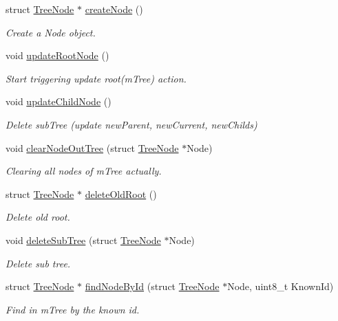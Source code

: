 \begin{DoxyCompactItemize}
struct \hyperlink{struct_tree_node}{Tree\+Node} $\ast$ \hyperlink{class_psd_map_a4413fa2f7b4dbc83449f184c6b4963cc}{create\+Node} ()
\begin{DoxyCompactList}\small\item\em Create a Node object. \end{DoxyCompactList}\item 
void \hyperlink{class_psd_map_ade677b7a2b308a4c5ce99f343ddc56ff}{update\+Root\+Node} ()
\begin{DoxyCompactList}\small\item\em Start triggering update root(m\+Tree) action. \end{DoxyCompactList}\item 
void \hyperlink{class_psd_map_a3129a5bf0d09334c47ee35a291ee688c}{update\+Child\+Node} ()
\begin{DoxyCompactList}\small\item\em Delete sub\+Tree (update new\+Parent, new\+Current, new\+Childs) \end{DoxyCompactList}\item 
void \hyperlink{class_psd_map_a1ed126a63203198d3aeca3ccef1f4577}{clear\+Node\+Out\+Tree} (struct \hyperlink{struct_tree_node}{Tree\+Node} $\ast$Node)
\begin{DoxyCompactList}\small\item\em Clearing all nodes of m\+Tree actually. \end{DoxyCompactList}\item 
struct \hyperlink{struct_tree_node}{Tree\+Node} $\ast$ \hyperlink{class_psd_map_a2f5e7823124673a335e20ee0e9821836}{delete\+Old\+Root} ()
\begin{DoxyCompactList}\small\item\em Delete old root. \end{DoxyCompactList}\item 
void \hyperlink{class_psd_map_a2309336d5a1a083f2d715a9dc520575d}{delete\+Sub\+Tree} (struct \hyperlink{struct_tree_node}{Tree\+Node} $\ast$Node)
\begin{DoxyCompactList}\small\item\em Delete sub tree. \end{DoxyCompactList}\item 
struct \hyperlink{struct_tree_node}{Tree\+Node} $\ast$ \hyperlink{class_psd_map_aec8b191b16852e62c4234dfba7885aa0}{find\+Node\+By\+Id} (struct \hyperlink{struct_tree_node}{Tree\+Node} $\ast$Node, uint8\+\_\+t Known\+Id)
\begin{DoxyCompactList}\small\item\em Find in m\+Tree by the known id. \end{DoxyCompactList}\item 

\end{DoxyCompactItemize}
